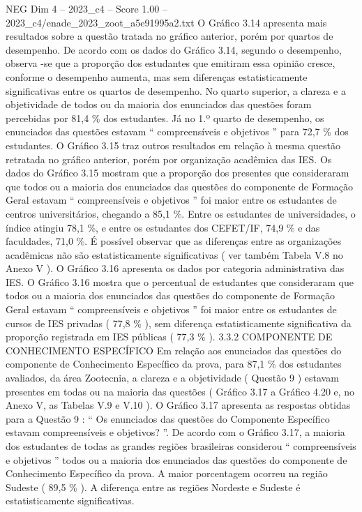 \begin{textsample}{NEG Dim 4 – 2023\_c4 – Score 1.00 – 2023\_c4/enade\_2023\_zoot\_a5e91995a2.txt}
O Gráfico 3.14 apresenta mais resultados sobre a questão tratada no gráfico anterior, porém por quartos de desempenho.
De acordo com os dados do Gráfico 3.14, segundo o desempenho, observa -se que a proporção dos estudantes que emitiram essa opinião cresce, conforme o desempenho aumenta, mas sem diferenças estatisticamente significativas entre os quartos de desempenho.
No quarto superior, a clareza e a objetividade de todos ou da maioria dos enunciados das questões foram percebidas por 81,4 \% dos estudantes.
Já no 1.º quarto de desempenho, os enunciados das questões estavam “ compreensíveis e objetivos ” para 72,7 \% dos estudantes.
O Gráfico 3.15 traz outros resultados em relação à mesma questão retratada no gráfico anterior, porém por organização acadêmica das IES.
Os dados do Gráfico 3.15 mostram que a proporção dos presentes que consideraram que todos ou a maioria dos enunciados das questões do componente de Formação Geral estavam “ compreensíveis e objetivos ” foi maior entre os estudantes de centros universitários, chegando a 85,1 \%.
Entre os estudantes de universidades, o índice atingiu 78,1 \%, e entre os estudantes dos CEFET/IF, 74,9 \% e das faculdades, 71,0 \%.
É possível observar que as diferenças entre as organizações acadêmicas não são estatisticamente significativas ( ver também Tabela V.8 no Anexo V ).
O Gráfico 3.16 apresenta os dados por categoria administrativa das IES.
O Gráfico 3.16 mostra que o percentual de estudantes que consideraram que todos ou a maioria dos enunciados das questões do componente de Formação Geral estavam “ compreensíveis e objetivos ” foi maior entre os estudantes de cursos de IES privadas ( 77,8 \% ), sem diferença estatisticamente significativa da proporção registrada em IES públicas ( 77,3 \% ). 3.3.2 COMPONENTE DE CONHECIMENTO ESPECÍFICO Em relação aos enunciados das questões do componente de Conhecimento Específico da prova, para 87,1 \% dos estudantes avaliados, da área Zootecnia, a clareza e a objetividade ( Questão 9 ) estavam presentes em todas ou na maioria das questões ( Gráfico 3.17 a Gráfico 4.20 e, no Anexo V, as Tabelas V.9 e V.10 ).
O Gráfico 3.17 apresenta as respostas obtidas para a Questão 9 : “ Os enunciados das questões do Componente Específico estavam compreensíveis e objetivos? ”.
De acordo com o Gráfico 3.17, a maioria dos estudantes de todas as grandes regiões brasileiras considerou “ compreensíveis e objetivos ” todos ou a maioria dos enunciados das questões do componente de Conhecimento Específico da prova.
A maior porcentagem ocorreu na região Sudeste ( 89,5 \% ).
A diferença entre as regiões Nordeste e Sudeste é estatisticamente significativas.

\end{textsample}
